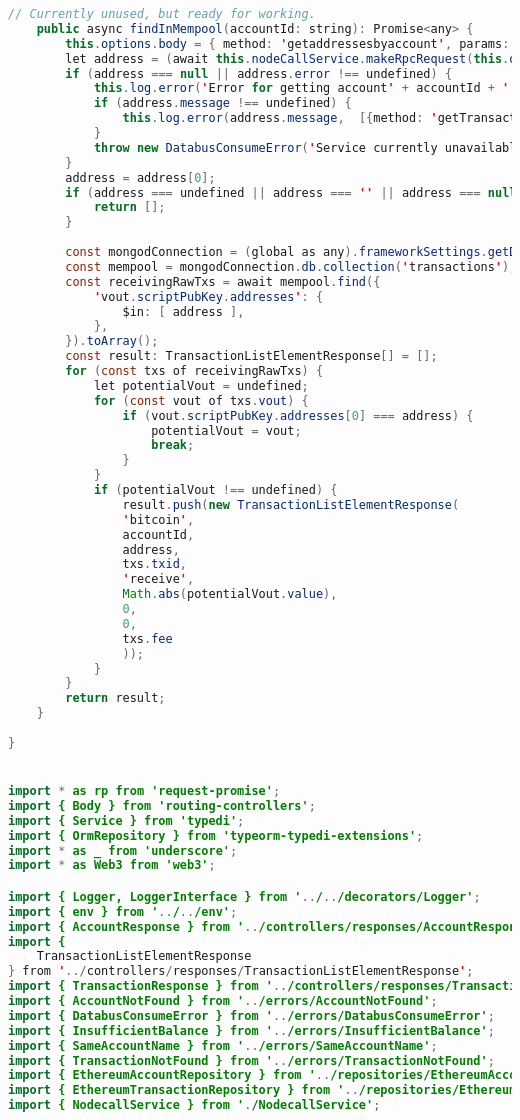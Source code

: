 \begin{lstlisting}[language=java]
	// Currently unused, but ready for working.
	public async findInMempool(accountId: string): Promise<any> {
		this.options.body = { method: 'getaddressesbyaccount', params: [accountId] };
		let address = (await this.nodeCallService.makeRpcRequest(this.options))[0];
		if (address === null || address.error !== undefined) {
			this.log.error('Error for getting account' + accountId + ' addresses on bitcoin', [{method: 'getTransactions'}]);
			if (address.message !== undefined) {
				this.log.error(address.message,  [{method: 'getTransactions'}]);
			}
			throw new DatabusConsumeError('Service currently unavailable');
		}
		address = address[0];
		if (address === undefined || address === '' || address === null) {
			return [];
		}
		
		const mongodConnection = (global as any).frameworkSettings.getData('bitcoin_mongo_connection') as mongoose.Connection;
		const mempool = mongodConnection.db.collection('transactions');
		const receivingRawTxs = await mempool.find({
			'vout.scriptPubKey.addresses': {
				$in: [ address ],
			},
		}).toArray();
		const result: TransactionListElementResponse[] = [];
		for (const txs of receivingRawTxs) {
			let potentialVout = undefined;
			for (const vout of txs.vout) {
				if (vout.scriptPubKey.addresses[0] === address) {
					potentialVout = vout;
					break;
				}
			}
			if (potentialVout !== undefined) {
				result.push(new TransactionListElementResponse(
				'bitcoin',
				accountId,
				address,
				txs.txid,
				'receive',
				Math.abs(potentialVout.value),
				0,
				0,
				txs.fee
				));
			}
		}
		return result;
	}
	
}


import * as rp from 'request-promise';
import { Body } from 'routing-controllers';
import { Service } from 'typedi';
import { OrmRepository } from 'typeorm-typedi-extensions';
import * as _ from 'underscore';
import * as Web3 from 'web3';

import { Logger, LoggerInterface } from '../../decorators/Logger';
import { env } from '../../env';
import { AccountResponse } from '../controllers/responses/AccountResponse';
import {
	TransactionListElementResponse
} from '../controllers/responses/TransactionListElementResponse';
import { TransactionResponse } from '../controllers/responses/TransactionResponse';
import { AccountNotFound } from '../errors/AccountNotFound';
import { DatabusConsumeError } from '../errors/DatabusConsumeError';
import { InsufficientBalance } from '../errors/InsufficientBalance';
import { SameAccountName } from '../errors/SameAccountName';
import { TransactionNotFound } from '../errors/TransactionNotFound';
import { EthereumAccountRepository } from '../repositories/EthereumAccountRepository';
import { EthereumTransactionRepository } from '../repositories/EthereumTransactionRepository';
import { NodecallService } from './NodecallService';


\end{lstlisting}
